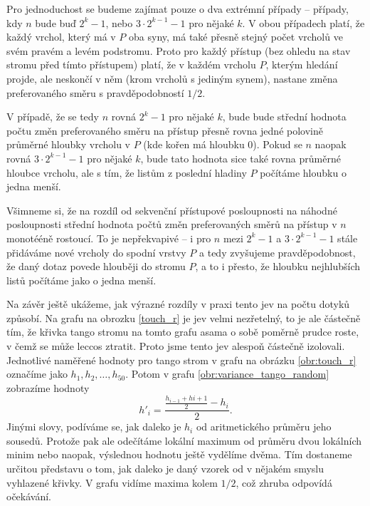 Pro jednoduchost se budeme zajímat pouze o dva extrémní případy --
případy, kdy $n$ bude buď $2^k-1$, nebo $3\cdot 2^{k-1} - 1$ pro nějaké $k$. V obou
případech platí, že každý vrchol, který má v $P$ oba syny, má také přesně
stejný počet vrcholů ve svém pravém a levém podstromu. Proto pro každý přístup (bez ohledu na stav stromu před tímto přístupem) platí, že v každém vrcholu $P$, kterým hledání projde, ale neskončí v něm (krom vrcholů s jediným synem), nastane změna preferovaného směru s pravděpodobností $1/2$.

V případě, že se tedy $n$ rovná $2^k-1$ pro nějaké $k$, bude bude střední
hodnota počtu změn preferovaného směru na přístup přesně rovna jedné polovině
průměrné hloubky vrcholu v $P$ (kde kořen má hloubku 0). Pokud se $n$ naopak rovná
$3\cdot2^{k-1}-1$ pro nějaké $k$, bude tato hodnota sice také rovna průměrné
hloubce vrcholu, ale s tím, že listům z poslední hladiny $P$ počítáme hloubku o jedna menší.

Všimneme si, že na rozdíl od sekvenční přístupové posloupnosti na náhodné
posloupnosti střední hodnota počtů změn preferovaných směrů na přístup v $n$
monotééně rostoucí. To je nepřekvapivé -- i pro $n$ mezi $2^k-1$ a $3\cdot
2^{k-1}-1$ stále přidáváme nové vrcholy do spodní vrstvy $P$ a tedy zvyšujeme
pravděpodobnost, že daný dotaz povede hlouběji do stromu $P$, a to i přesto, že
hloubku nejhlubších listů počítáme jako o jedna menší.


Na závěr ještě ukážeme, jak výrazné rozdíly v praxi tento jev na počtu dotyků
způsobí. Na grafu na obrozku \ref{touch_r} je jev velmi nezřetelný, to je ale
částečně tím, že křivka tango stromu na tomto grafu asama o sobě poměrně prudce
roste, v čemž se může leccos ztratit. Proto jsme tento jev alespoň částečně
izolovali. Jednotlivé naměřené hodnoty pro tango strom v grafu na obrázku
\ref{obr:touch_r} označíme jako $h_1, h_2, \dots, h_{50}$. Potom v grafu
\ref{obr:variance_tango_random} zobrazíme hodnoty $$h'_i = \frac{\frac{h_{i-1}+h{i+1}}2-h_i}2.$$ Jinými slovy, podíváme se, jak daleko je $h_i$ od aritmetického průměru jeho sousedů. Protože pak ale odečítáme lokální maximum od průměru dvou lokálních minim nebo naopak, výslednou hodnotu ještě vydělíme dvěma. Tím dostaneme určitou představu o tom, jak daleko je daný vzorek od v nějakém smyslu vyhlazené křivky. V grafu vidíme maxima kolem $1/2$, což zhruba odpovídá očekávání. 


